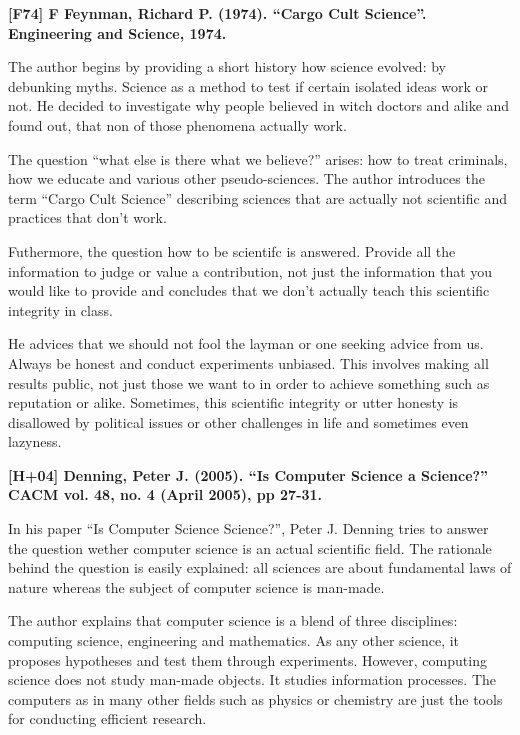 \documentclass[a4paper,12pt,english]{scrartcl}
\begin{document}
\pagestyle{fancy} %

\noindent
\textbf{\textsf{{\large [F74] F Feynman, Richard P. (1974). \enquote{Cargo Cult Science}. Engineering and Science, 1974.}}}
\vspace{2mm}

The author begins by providing a short history how science evolved: by
debunking myths. Science as a method to test if certain isolated ideas work or
not. He decided to investigate why people believed in witch doctors and alike
and found out, that non of those phenomena actually work.

The question \enquote{what else is there what we believe?} arises: how to
treat criminals, how we educate and various other pseudo-sciences. The author
introduces the term \enquote{Cargo Cult Science} describing sciences that are
actually not scientific and practices that don't work.

Futhermore, the question how to be scientifc is answered. Provide all the
information to judge or value a contribution, not just the information
that you would like to provide and concludes that we don't actually teach this
scientific integrity in class.

He advices that we should not fool the layman or one seeking advice from us.
Always be honest and conduct experiments unbiased. This involves making all
results public, not just those we want to in order to achieve something such
as reputation or alike.
Sometimes, this scientific integrity or utter honesty is disallowed by
political issues or other challenges in life and sometimes even lazyness.

\vspace{8mm}

\noindent
\textbf{\textsf{{\large [H+04] Denning, Peter J. (2005). \enquote{Is Computer Science a Science?} CACM vol. 48, no. 4 (April 2005), pp 27-31.}}}
\vspace{2mm}

In his paper \enquote{Is Computer Science Science?}, Peter J. Denning tries
to answer the question wether computer science is an actual scientific field.
The rationale behind the question is easily explained: all sciences are about
fundamental laws of nature whereas the subject of computer science is
man-made.

The author explains that computer science is a blend of three disciplines:
computing science, engineering and mathematics. As any other science, it
proposes hypotheses and test them through experiments. However, computing
science does not study man-made objects. It studies information processes.
The computers \textemdash{} as in many other fields such as physics or chemistry
\textemdash{} are just the tools for conducting efficient research.
\end{document}
